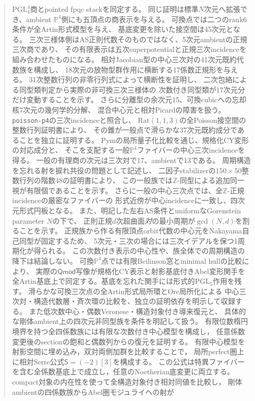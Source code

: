 \documentclass[11pt,a4paper]{ltjsarticle}
\numberwithin{equation}{section}
\newcommand{\PP}{\mathbb P}
\newcommand{\PGL}{\mathrm{PGL}}
\begin{document}
\begin{abstract}
$\PGL_4^4$商とpointed fpqc stackを同定する。
同じ証明は標準$N$次元へ拡張でき、ambient $\PP^4$側にも五頂点の商表示を与える。
可換点では二つのrank6条件が全Artin形式模型を与え、
基底変更を除いた接空間は45次元となる。
三次三様体側はAS正則代数そのものではなく、5次元ambientの正規三次商であり、
その有限表示は五次superpotentialと正規三次incidenceを組み合わせたものになる。
相対Jacobian型の中心三次対の41次元既約代数族を構成し、
18次元の放物型群作用に横断する17係数正規形を与える。
31次整数行列の非零行列式によって横断性を証明し、
二次包絡による同型類判定から実際の非可換三次三様体の
次数付き同型類が17次元分だけ変動することを示す。
さらに分離型の余次元15、可換cubicへの忘却核7次元の幾何学的分解、
混合中心元と相対Picardの障害を扱う。
\texttt{poisson-p4}の三次incidenceと照合し、
$\mathrm{Rat}(1,1,3)$の全Poisson接空間の整数行列証明書により、
その錐が一般点で滑らかな37次元既約成分であることを独立に証明する。
Pymの局所量子化比較を通じ、規格化CY変形の対応成分と、
そこを支配する一般$\PP^4$ファイバーの中心三次incidenceを得る。
一般の有理商の次元は三次対で17、ambientで13である。
周期構造を忘れる射を捩れ共役の問題として記述し、
二因子stabilizerの$150\times50$整数行列の階数48の証明書により、
この一般族では$\mathbb Z$-同型による追加同一視が有限個であることを示す。
さらに一般の中心三次点では、全$\mathbb Z$-正規incidenceの厳密なファイバーの
形式近傍が中心incidenceに一致し、四次元形式円板となる。
また、明記した左右AS条件とuniformなGorenstein parameter $N$の下で、
正則正規$d$次超曲面\emph{対}の最小周期が$\gcd(N,d)$を割ることを示す。
正規族から作る有限頂点orbit代数の中心元をNakayama自己同型が固定するため、
5次元・三次の場合には三次イデアルを保つ1周期化が得られる。
この次数付き表示の中心性や、族全体での周期構造の降下は結論しない。
可換$\PP^4$点では有限Beilinson窓とminimal hullの比較により、
実際の$\mathsf{Qmod}$写像が規格化CY表示と射影基底付きAbel変形関手を
全Artin基底上で同定する。基底を忘れた関手には形式的$\PGL_5$作用を残す。
滑らかな可換三次点の全Artin形式局所環とOre局所化による
中心三次対・構造代数層・斉次環の比較を、独立の証明依存を明示して収録する。
また低次数中心・偶数Veronese・構造対象付き導来復元と、
具体的な剛体ambient上の四次元非同型族を条件を明記して扱う。
有限位数楕円境界を持つ全四係数族には有限な次数付き中心模型を構成し，
任意係数変更後のsectionの飽和と偶数列からの復元を証明する。
有限中心模型を射影空間に埋め込み，双対両側加群を比較することで，
局所perfect圏上に相対Serre公式$\mathsf S=(-2)[3]$を構成する。
この公式は特異ファイバーを含む全係数基底上で成立し，任意のNoetherian底変更に両立する。
compact対象の内在性を使って全構造対象付き相対同値を比較し，
剛体ambientの四係数族からAbel圏モジュライへの射が

\end{abstract}
\end{document}
